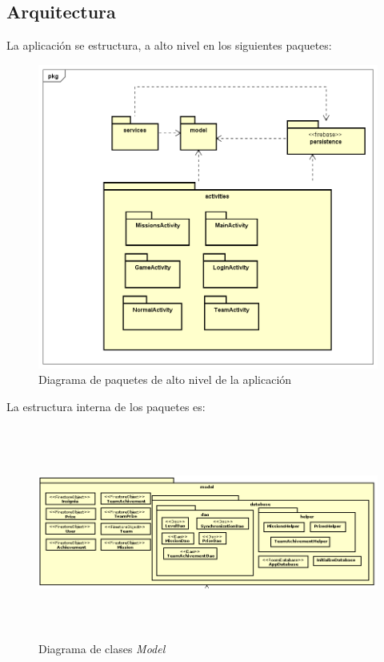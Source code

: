 \documentclass[twoside]{report}
\begin{document}
\subsection{Arquitectura}
La aplicación se estructura, a alto nivel en los siguientes paquetes:
\begin{figure}[H]
\centering
\includegraphics[scale=0.5]{images/structureHighLevel}
\caption{Diagrama de paquetes de alto nivel de la aplicación}
\end{figure}

\clearpage

La estructura interna de los paquetes es:

\begin{figure}[H]
\centering
\includegraphics[height=7cm,width=\textwidth]{images/structureModel.PNG}
\caption{Diagrama de clases \textit{Model}}
\end{figure}
\end{document}
